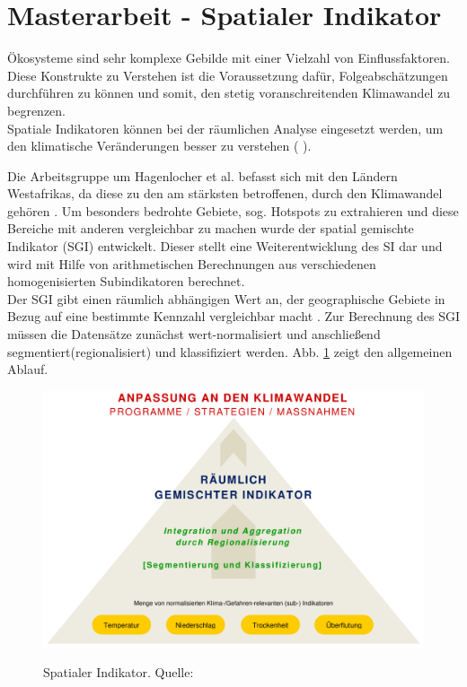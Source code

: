 \documentclass[10pt,conference,compsocconf]{IEEEtran}
\begin{document}
\section{Masterarbeit - Spatialer Indikator}
Ökosysteme sind sehr komplexe Gebilde mit einer Vielzahl von Einflussfaktoren. Diese Konstrukte zu Verstehen ist die Voraussetzung dafür, Folgeabschätzungen durchführen zu können und somit, den stetig voranschreitenden Klimawandel zu begrenzen.\\
Spatiale Indikatoren können bei der räumlichen Analyse eingesetzt werden, um den klimatische Veränderungen besser zu verstehen (\cite{cline2014early} \cite{costa2014fragmentation} \cite{mattingly2014housing}).\par
Die Arbeitsgruppe um Hagenlocher et al. \cite{hagenlocher2014modeling} befasst sich mit den Ländern Westafrikas, da diese zu den am stärksten betroffenen, durch den Klimawandel gehören \cite{hamro2014livelihood}. Um besonders bedrohte Gebiete, sog. Hotspots zu extrahieren und diese Bereiche mit anderen vergleichbar zu machen wurde der spatial gemischte Indikator (SGI) entwickelt. Dieser stellt eine Weiterentwicklung des SI dar und wird mit Hilfe von arithmetischen Berechnungen aus verschiedenen homogenisierten Subindikatoren berechnet.\\

Der SGI gibt einen räumlich abhängigen Wert an, der geographische Gebiete in Bezug auf eine bestimmte Kennzahl vergleichbar macht \cite{anselin1995local}. Zur Berechnung des SGI müssen die Datensätze zunächst wert-normalisiert und anschließend segmentiert(regionalisiert) und klassifiziert werden. Abb. \ref{img:Spatialer_Indikator} zeigt den allgemeinen Ablauf.\\
\begin{figure}[H]
	\centering
	\includegraphics[width=1\columnwidth]{img/Spatialer_Indikator.png} \\
	\caption[]{Spatialer Indikator. Quelle: \cite{mariuszMaster}}
	\label{img:Spatialer_Indikator}
\end{figure}
\end{document}
